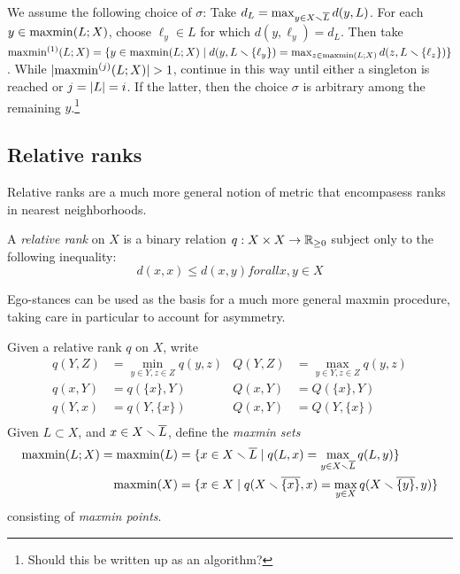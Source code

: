 \documentclass[
]{article}
\begin{document}
We assume the following choice of \(\sigma\): Take
\(d_L = \max_{y \in X \smallsetminus \overline{L}}{d(y,L)}\). For each
\(y \in \operatorname{maxmin}(L;X)\), choose \(\ell_y \in L\) for which
\(d(y,\ell_y) = d_L\). Then take
\(\operatorname{maxmin}^{(1)}(L;X) = \{y \in \operatorname{maxmin}(L;X) \mid d(y,L \smallsetminus \{\ell_y\}) = \max_{z \in \operatorname{maxmin}(L;X)}{d(z,L \smallsetminus \{\ell_z\})}\}\).
While \(\lvert \operatorname{maxmin}^{(j)}(L;X)\rvert > 1\), continue in this way until
either a singleton is reached or \(j=\lvert L\rvert=i\). If the latter, then
the choice \(\sigma\) is arbitrary among the remaining \(y\).\footnote{Should
  this be written up as an algorithm?}

\hypertarget{relative-ranks}{%
\subsection{Relative ranks}\label{relative-ranks}}

Relative ranks are a much more general notion of metric that encompasess
ranks in nearest neighborhoods.

\begin{definition}
    A \emph{relative rank} on $X$ is a binary relation $q: X \times X \to \mathbb{R}_{\geq 0}$ subject only to the following inequality:
    \begin{equation}\label{eqn:relative-rank}
        d(x,x) \leq d(x,y) for all x,y \in X
    \end{equation}
\end{definition}

Ego-stances can be used as the basis for a much more general maxmin
procedure, taking care in particular to account for asymmetry.

\begin{definition}
Given a relative rank $q$ on $X$, write
\begin{align*}
    q(Y,Z) &= \min_{y\in Y,z\in Z}{q(y,z)} & Q(Y,Z) &= \max_{y\in Y,z\in Z}{q(y,z)} \\
    q(x,Y) &= q(\{x\},Y)                   & Q(x,Y) &= Q(\{x\},Y) \\
    q(Y,x) &= q(Y,\{x\})                   & Q(x,Y) &= Q(Y,\{x\}) \\
\end{align*}
Given $L\subset X$, and $x\in X\smallsetminus \overline{L}$, define the \emph{maxmin sets}
\begin{align*}
    \operatorname{maxmin}(L;X) = \operatorname{maxmin}(L) &= \{x\in X \smallsetminus \overline{L}\mid q(L,x) = \max_{y\in X\smallsetminus \overline{L}}{q(L,y)}\} \\
    \operatorname{maxmin}(X) &= \{x\in X\mid q(X \smallsetminus \overline{\{x\}},x) = \max_{y\in X}{q(X \smallsetminus \overline{\{y\}},y)}\}
\end{align*}
consisting of \emph{maxmin points}.
\end{definition}
\end{document}
